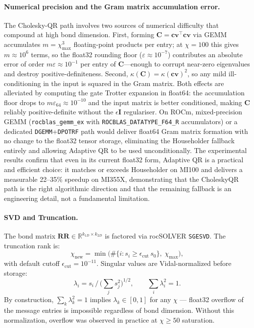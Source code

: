 \documentclass[11pt]{article}
\newcommand{\chimax}{\chi_{\mathrm{max}}}
\begin{document}
\paragraph{Numerical precision and the Gram matrix accumulation error.}
The Cholesky-QR path involves two sources of numerical difficulty that compound
at high bond dimension.
First, forming $\mathbf{C} = \mathbf{cv}^\top \mathbf{cv}$ via GEMM accumulates
$m = \chimax^3$ floating-point products per entry; at $\chi=100$ this gives
$m \approx 10^6$ terms, so the float32 rounding floor
($\varepsilon \approx 10^{-7}$) contributes an absolute error of order
$m\varepsilon \approx 10^{-1}$ per entry of $\mathbf{C}$---enough to corrupt
near-zero eigenvalues and destroy positive-definiteness.
Second, $\kappa(\mathbf{C}) = \kappa(\mathbf{cv})^2$, so any mild ill-conditioning
in the input is squared in the Gram matrix.
Both effects are alleviated by computing the gate Trotter expansion in float64:
the accumulation floor drops to $m\varepsilon_{64} \approx 10^{-10}$ and the
input matrix is better conditioned, making $\mathbf{C}$ reliably positive-definite
without the $\epsilon\mathbf{I}$ regulariser.
On ROCm, mixed-precision GEMM (\texttt{rocblas\_gemm\_ex} with
\texttt{ROCBLAS\_DATATYPE\_F64\_R} accumulators) or a dedicated
\texttt{DGEMM}+\texttt{DPOTRF} path would deliver float64 Gram matrix
formation with no change to the float32 tensor storage, eliminating the
Householder fallback entirely and allowing Adaptive QR to be used unconditionally.
The experimental results confirm that even in its
current float32 form, Adaptive QR is a practical and efficient choice:
it matches or exceeds Householder on MI100 and delivers a measurable 22--35\%
speedup on MI355X, demonstrating that the CholeskyQR path is the right
algorithmic direction and that the remaining fallback is an engineering detail,
not a fundamental limitation.

\paragraph{SVD and Truncation.}
The bond matrix $\mathbf{RR} \in \mathbb{R}^{k_{1D} \times k_{2D}}$ is factored
via rocSOLVER \texttt{SGESVD}. The truncation rank is:
\begin{equation}
  \chi_{\text{new}} = \min\!\bigl(\#\{i : s_i \geq \epsilon_{\text{cut}}\, s_0\},\;
                                   \chimax\bigr),
  \label{eq:truncation}
\end{equation}
with default cutoff $\epsilon_{\text{cut}} = 10^{-11}$.
Singular values are Vidal-normalized before storage:
\begin{equation}
  \lambda_i = s_i \,/\, \bigl(\textstyle\sum_j s_j^2\bigr)^{1/2},
  \qquad \sum_i \lambda_i^2 = 1.
  \label{eq:vidal_norm}
\end{equation}
By construction, $\sum_k \lambda_k^2 = 1$ implies $\lambda_k \in [0,1]$ for
any $\chi$ — float32 overflow of the message entries is impossible regardless
of bond dimension. Without this normalization, overflow was observed in practice
at $\chi \geq 50$ saturation.
\end{document}
